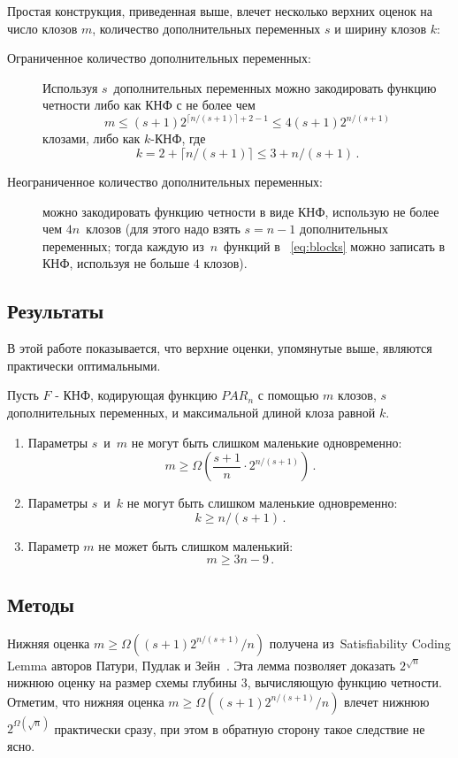 Простая конструкция, приведенная выше, влечет несколько верхних оценок 
на число клозов $m$, количество дополнительных переменных $s$ и ширину клозов $k$:
\begin{description}
	\item[Ограниченное количество дополнительных переменных:]
	Используя $s$~дополнительных переменных можно закодировать функцию четности либо как 
	КНФ с не более чем \[m \le (s+1)2^{\lceil n/(s+1) \rceil+2-1} \le 4(s+1)2^{n/(s+1)}\] клозами, либо как $k$-КНФ, где  \[k=2+{\lceil n/(s+1) \rceil} \le 3+n/(s+1) \, .\]
	\item[Неограниченное количество дополнительных переменных:] можно закодировать функцию четности в виде КНФ, использую не более чем $4n$~клозов (для этого надо взять $s=n-1$ дополнительных переменных; тогда каждую из~$n$~функций в ~\eqref{eq:blocks} можно записать в КНФ, используя не больше $4$ клозов).
\end{description}
\subsection{Результаты}
В этой работе показывается, что верхние оценки, упомянутые выше, являются практически оптимальными. 
\begin{theorem}\label{thm:main}
	Пусть $F$ - КНФ, кодирующая функцию $PAR_n$ с помощью $m$ клозов, 
	$s$ дополнительных переменных, и максимальной длиной клоза равной $k$.
	\begin{enumerate}
		\item Параметры $s$~и~$m$ не могут быть слишком маленькие одновременно:
		\begin{equation}\label{eq:sm}
			m \ge \Omega\left(\frac{s+1}{n} \cdot 2^{n/(s+1)}\right) \, .
		\end{equation}
		\item Параметры $s$~и~$k$ не могут быть слишком маленькие одновременно:
		\begin{equation}\label{eq:sw}
			k \ge n/(s+1) \, .
		\end{equation}
		\item Параметр $m$ не может быть слишком маленький:
		\begin{equation}\label{eq:m}
			m \ge 3n-9 \, .
		\end{equation}
	\end{enumerate}
\end{theorem}

\subsection{Методы}
Нижняя оценка $m \ge \Omega((s+1)2^{n/(s+1)}/n)$ получена 
из~Satisfiability Coding Lemma авторов Патури, Пудлак и Зейн~\cite{DBLP:journals/cjtcs/PaturiPZ99}. 
Эта лемма позволяет доказать $2^{\sqrt{n}}$ нижнюю оценку на размер схемы глубины $3$, вычисляющую функцию четности. 
Отметим, что нижняя оценка $m \ge \Omega((s+1)2^{n/(s+1)}/n)$ влечет нижнюю $2^{\Omega(\sqrt n)}$ практически сразу,
при этом в обратную сторону такое следствие не ясно.

